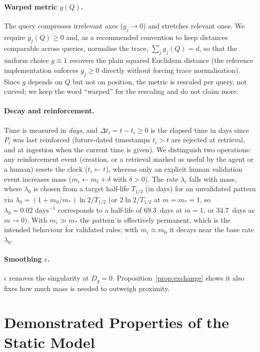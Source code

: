 \documentclass[11pt]{article}
\theoremstyle{remark}
\newcommand{\dist}{D_g}
\begin{document}
\paragraph{Warped metric $g(Q)$.}
The query compresses irrelevant axes ($g_j\to 0$) and stretches relevant ones. We require $g_j(Q)\ge 0$ and, as a recommended convention to keep distances comparable across queries, normalise the trace, $\sum_j g_j(Q)=d$, so that the uniform choice $g\equiv 1$ recovers the plain squared Euclidean distance (the reference implementation enforces $g_j\ge 0$ directly without forcing trace normalisation). Since $g$ depends on $Q$ but not on position, the metric is rescaled per query, not curved; we keep the word ``warped'' for the rescaling and do not claim more.

\paragraph{Decay and reinforcement.}
Time is measured in \emph{days}, and $\Delta t_i = t - t_i \ge 0$ is the elapsed time in days since $P_i$ was last reinforced (future-dated timestamps $t_i > t$ are rejected at retrieval, and at ingestion when the current time is given). We distinguish two operations: any reinforcement event (creation, or a retrieval marked as useful by the agent or a human) resets the clock ($t_i\leftarrow t$), whereas only an explicit human validation event increases mass ($m_i\leftarrow m_i+\delta$ with $\delta>0$). The rate $\lambda_i$ falls with mass, where $\lambda_0$ is chosen from a target half-life $T_{1/2}$ (in days) for an unvalidated pattern via $\lambda_0 = (1+m_0/m_\ast)\ln 2 / T_{1/2}$ (or $2\ln 2/T_{1/2}$ at $m=m_\ast=1$, so $\lambda_0=0.02\text{ days}^{-1}$ corresponds to a half-life of $69.3$~days at $m=1$, or $34.7$~days as $m\to 0$). With $m_i\gg m_\ast$ the pattern is effectively permanent, which is the intended behaviour for validated rules; with $m_i\approx m_0$ it decays near the base rate $\lambda_0$.

\paragraph{Smoothing $\epsilon$.}
$\epsilon$ removes the singularity at $\dist=0$. Proposition~\ref{prop:exchange} shows it also fixes how much mass is needed to outweigh proximity.

\section{Demonstrated Properties of the Static Model}
\label{sec:properties}
\end{document}
